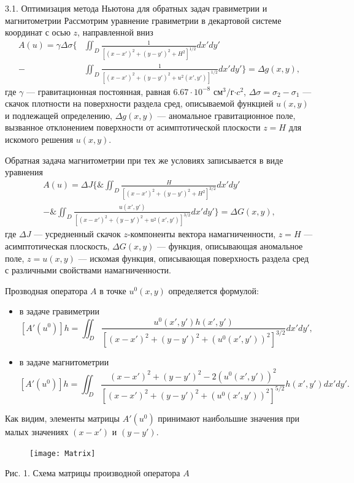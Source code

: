\documentclass[10pt,pdf, mathserif, hyperref={unicode}]{beamer}
\begin{document}
\begin{frame}{3.1. Оптимизация метода Ньютона для обратных задач гравиметрии и магнитометрии}
	Рассмотрим уравнение гравиметрии в декартовой системе координат с осью $z$, направленной вниз 
	\begin{equation*}
	\begin{aligned}
	A(u)=\gamma\Delta\sigma \bigg\{ &\iint_{D} \frac{1}{[(x-x')^2+(y-y')^2+H^2]^{1/2}}dx'dy' \\
	- &\iint_{D} \frac{1}{[(x-x')^2+(y-y')^2+u^2(x',y')]^{1/2}}dx'dy'\bigg\}=\Delta g(x,y),
	\end{aligned} 
	\end{equation*}
	где $\gamma$ --- гравитационная постоянная, равная $6.67\cdot10^{-8}$ см$^3/$г$\cdot c^2$, $\Delta\sigma=\sigma_2-\sigma_1$ --- скачок плотности на поверхности раздела сред, описываемой функцией $u(x,y)$ и подлежащей определению, $\Delta g(x,y)$ --- аномальное гравитационное поле, вызванное отклонением поверхности от асимптотической плоскости $z=H$ для искомого решения $u(x,y)$.
\end{frame}
\begin{frame}
	Обратная задача магнитометрии при тех же условиях записывается в виде уравнения
	\begin{equation*}
	\begin{aligned}
	A(u)=\Delta J  \bigg\{\&\iint_{D} \frac{H}{[(x-x')^2+(y-y')^2+H^2]^{3/2}}dx'dy' \\
	- \&\iint_{D} \frac{u(x',y')}{[(x-x')^2+(y-y')^2+u^2(x',y')]^{3/2}}dx'dy' \bigg\}=\Delta G(x,y), %
	\end{aligned} 
	\end{equation*}
	где $\Delta J$ --- усредненный скачок $z$-компоненты вектора намагниченности, $z=H$ --- асимптотическая плоскость, $\Delta G(x,y)$ --- функция, описывающая аномальное поле, $z=u(x,y)$ --- искомая функция, описывающая поверхность раздела сред с различными свойствами намагниченности.
\end{frame}
\begin{frame}
	Прозводная оператора $A$ в точке $u^0(x,y)$ определяется формулой:
	\begin{itemize}
		\item в задаче гравиметрии
		$$ [A'(u^0)]h=\iint_{D} \frac{u^0(x',y')h(x',y')}{[(x-x')^2+(y-y')^2+(u^0(x',y'))^2]^{3/2}}dx'dy',$$
		\item в задаче магнитометрии
		$$ [A'(u^0)]h=\iint_{D} \frac{(x-x')^2+(y-y')^2-2(u^0(x',y'))^2}{[(x-x')^2+(y-y')^2+(u^0(x',y'))^2]^{5/2}}h(x',y')dx'dy'.$$
	\end{itemize}
	Как видим, элементы матрицы $A'(u^0)$ принимают наибольшие значения при малых значениях $(x-x')$ и $(y-y')$.
	\begin{figure}
		\texttt{[image: Matrix]}
	\end{figure}
	\centering Рис. 1. Схема матрицы производной оператора $A$
\end{frame}
\end{document}
